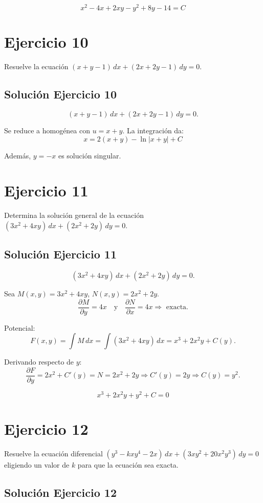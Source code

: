 \documentclass[12pt]{article}
\begin{document}
\[
\boxed{\,x^2-4x+2xy-y^2+8y-14=C\,}
\]

\section*{Ejercicio 10}
Resuelve la ecuación $(x + y - 1)\,dx + (2x + 2y - 1)\,dy = 0$.

\subsection*{Solución Ejercicio 10}

\[
(x+y-1)\,dx+(2x+2y-1)\,dy=0.
\]

Se reduce a homogénea con \(u=x+y\). La integración da:
\[
\boxed{\,x=2(x+y)-\ln|x+y|+C\,}
\]

Además, \(y=-x\) es solución singular.

\section*{Ejercicio 11}
Determina la solución general de la ecuación $(3x^2 + 4xy)\,dx + (2x^2 + 2y)\,dy = 0$.

\subsection*{Solución Ejercicio 11}

\[
(3x^2+4xy)\,dx+(2x^2+2y)\,dy=0.
\]

Sea \(M(x,y)=3x^2+4xy\), \(N(x,y)=2x^2+2y\).
\[
\frac{\partial M}{\partial y}=4x
\quad\text{y}\quad
\frac{\partial N}{\partial x}=4x
\Rightarrow\text{ exacta.}
\]

Potencial:
\[
F(x,y)=\int M\,dx=\int(3x^2+4xy)\,dx=x^3+2x^2y+C(y).
\]

Derivando respecto de \(y\):
\[
\frac{\partial F}{\partial y}=2x^2+C'(y)=N=2x^2+2y
\Rightarrow C'(y)=2y \Rightarrow C(y)=y^2.
\]

\[
\boxed{\,x^3+2x^2y+y^2+C=0\,}
\]

\section*{Ejercicio 12}
Resuelve la ecuación diferencial $(y^3 - kxy^4 - 2x)\,dx + (3xy^2 + 20x^2y^3)\,dy = 0$ eligiendo un valor de $k$ para que la ecuación sea exacta.

\subsection*{Solución Ejercicio 12}
\end{document}
